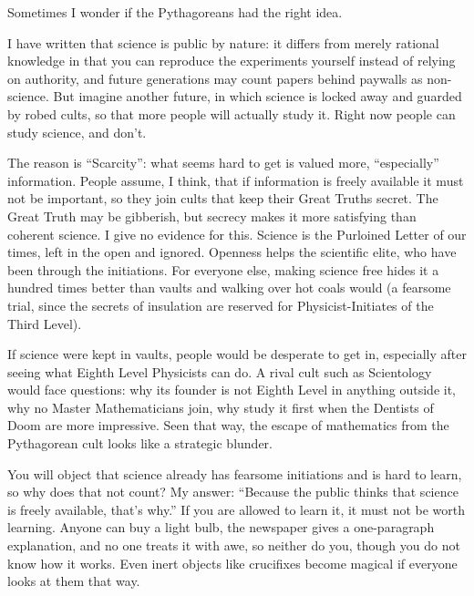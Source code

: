 
Sometimes I wonder if the Pythagoreans had the right idea. 

I have written that science is public by nature: it differs from merely rational knowledge in that you can reproduce the experiments yourself instead of relying on authority, and future generations may count papers behind paywalls as non-science. But imagine another future, in which science is locked away and guarded by robed cults, so that more people will actually study it. Right now people can study science, and don't.

The reason is ``Scarcity'': what seems hard to get is valued more, ``especially'' information.  People assume, I think, that if information is freely available it must not be important, so they join cults that keep their Great Truths secret. The Great Truth may be gibberish, but secrecy makes it more satisfying than coherent science. I give no evidence for this. Science is the Purloined Letter of our times, left in the open and ignored. Openness helps the scientific elite, who have been through the initiations. For everyone else, making science free hides it a hundred times better than vaults and walking over hot coals would (a fearsome trial, since the secrets of insulation are reserved for Physicist-Initiates of the Third Level).

If science were kept in vaults, people would be desperate to get in, especially after seeing what Eighth Level Physicists can do. A rival cult such as Scientology would face questions: why its founder is not Eighth Level in anything outside it, why no Master Mathematicians join, why study it first when the Dentists of Doom are more impressive. Seen that way, the escape of mathematics from the Pythagorean cult looks like a strategic blunder.

You will object that science already has fearsome initiations and is hard to learn, so why does that not count? My answer: ``Because the public thinks that science is freely available, that's why.'' If you are allowed to learn it, it must not be worth learning. Anyone can buy a light bulb, the newspaper gives a one-paragraph explanation, and no one treats it with awe, so neither do you, though you do not know how it works. Even inert objects like crucifixes become magical if everyone looks at them that way.

